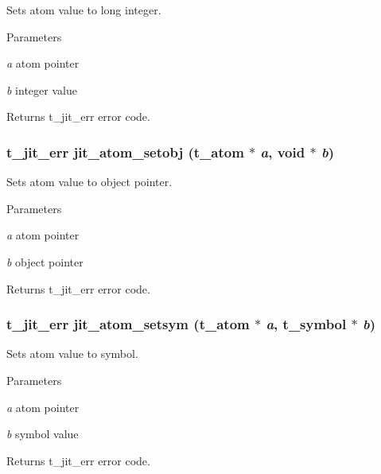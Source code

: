 Sets atom value to long integer. 
\begin{DoxyParams}{Parameters}
\item[{\em a}]atom pointer \item[{\em b}]integer value\end{DoxyParams}
\begin{DoxyReturn}{Returns}
t\_\-jit\_\-err error code. 
\end{DoxyReturn}
\hypertarget{group__atommod_gaa32f4a02a9c8b281043220b713d15e3e}{
\subsubsection[{jit\_\-atom\_\-setobj}]{\setlength{\rightskip}{0pt plus 5cm}t\_\-jit\_\-err jit\_\-atom\_\-setobj ({\bf t\_\-atom} $\ast$ {\em a}, \/  void $\ast$ {\em b})}}
\label{group__atommod_gaa32f4a02a9c8b281043220b713d15e3e}


Sets atom value to object pointer. 
\begin{DoxyParams}{Parameters}
\item[{\em a}]atom pointer \item[{\em b}]object pointer\end{DoxyParams}
\begin{DoxyReturn}{Returns}
t\_\-jit\_\-err error code. 
\end{DoxyReturn}
\hypertarget{group__atommod_ga8034b94e985f9c616c108fdf426ebcf4}{
\subsubsection[{jit\_\-atom\_\-setsym}]{\setlength{\rightskip}{0pt plus 5cm}t\_\-jit\_\-err jit\_\-atom\_\-setsym ({\bf t\_\-atom} $\ast$ {\em a}, \/  {\bf t\_\-symbol} $\ast$ {\em b})}}
\label{group__atommod_ga8034b94e985f9c616c108fdf426ebcf4}


Sets atom value to symbol. 
\begin{DoxyParams}{Parameters}
\item[{\em a}]atom pointer \item[{\em b}]symbol value\end{DoxyParams}
\begin{DoxyReturn}{Returns}
t\_\-jit\_\-err error code. 
\end{DoxyReturn}
